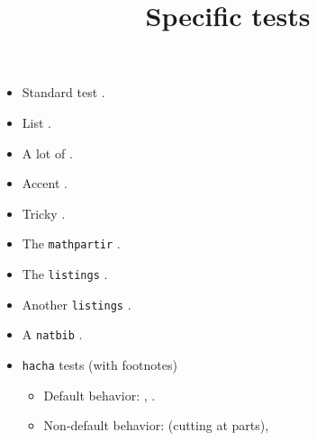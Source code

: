 \documentclass{article}
\title{Specific tests}
\author{}
\date{}
\begin{document}
\maketitle
\begin{itemize}
\item Standard test .
\item List .
\item A lot of .
\item Accent .
\item Tricky .
\item The \texttt{mathpartir} .
\item The \texttt{listings} .
\item Another \texttt{listings} .
\item A \texttt{natbib} .
\item \texttt{hacha} tests (with footnotes)
\begin{itemize}
\item Default behavior: ,
.
\item Non-default behavior: 
(cutting at parts), 
\end{itemize}
\end{itemize}
\end{document}
